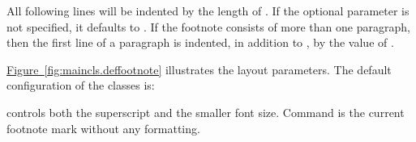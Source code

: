 All following lines will be indented by the length of . If the
optional parameter  is not specified, it defaults to
.  If the footnote consists of more than one paragraph, then the
first line of a paragraph is indented, in addition to , by the
value of .

\hyperref[fig:maincls.deffootnote]{Figure~\ref*{fig:maincls.deffootnote}} %
%
illustrates the layout parameters. The default configuration of the
{\KOMAScript} classes is:
\begin{lstcode}
    {\textsuperscript{\thefootnotemark}}
\end{lstcode}
 controls both the superscript and the smaller
font size. Command  is the current footnote mark
without any formatting.%
%

